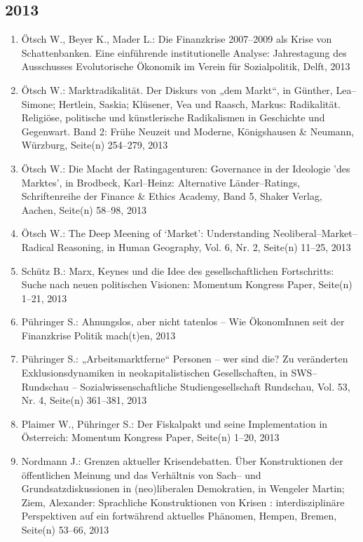 \subsection*{2013}
\begin{enumerate}
    	 \item Ötsch W., Beyer K., Mader L.: Die Finanzkrise 2007--2009 als Krise von Schattenbanken. Eine einführende institutionelle Analyse: Jahrestagung des Ausschusses Evolutorische Ökonomik im Verein für Sozialpolitik, Delft, 2013
	 \item Ötsch W.: Marktradikalität. Der Diskurs von „dem Markt“, in Günther, Lea--Simone; Hertlein, Saskia;  Klüsener, Vea und Raasch, Markus: Radikalität. Religiöse, politische und künstlerische Radikalismen in Geschichte und Gegenwart.  Band 2: Frühe Neuzeit und Moderne, Königshausen \& Neumann, Würzburg, Seite(n) 254--279, 2013
	 \item Ötsch W.: Die Macht der Ratingagenturen: Governance in der Ideologie 'des Marktes', in Brodbeck, Karl--Heinz: Alternative Länder--Ratings, Schriftenreihe der Finance \& Ethics Academy, Band 5, Shaker Verlag, Aachen, Seite(n) 58--98, 2013
	 \item Ötsch W.: The Deep Meening of ‘Market’: Understanding Neoliberal--Market--Radical Reasoning, in Human Geography, Vol. 6, Nr. 2, Seite(n) 11--25, 2013
	 \item Schütz B.: Marx, Keynes und die Idee des gesellschaftlichen Fortschritts: Suche nach neuen politischen Visionen: Momentum Kongress Paper, Seite(n) 1--21, 2013
	 \item Pühringer S.: Ahnungslos, aber nicht tatenlos – Wie ÖkonomInnen seit der Finanzkrise Politik mach(t)en, 2013
	 \item Pühringer S.: „Arbeitsmarktferne“ Personen – wer sind die? Zu veränderten Exklusionsdynamiken in neokapitalistischen Gesellschaften, in SWS--Rundschau -- Sozialwissenschaftliche Studiengesellschaft Rundschau, Vol. 53, Nr. 4, Seite(n) 361--381, 2013
	 \item Plaimer W., Pühringer S.: Der Fiskalpakt und seine Implementation in Österreich: Momentum Kongress Paper, Seite(n) 1--20, 2013
	 \item Nordmann J.: Grenzen aktueller Krisendebatten. Über Konstruktionen der öffentlichen Meinung und das Verhältnis von Sach-- und Grundsatzdiskussionen in (neo)liberalen Demokratien, in Wengeler Martin; Ziem, Alexander: Sprachliche Konstruktionen von Krisen : interdisziplinäre Perspektiven auf ein fortwährend aktuelles Phänomen, Hempen, Bremen, Seite(n) 53--66, 2013

\end{enumerate}
